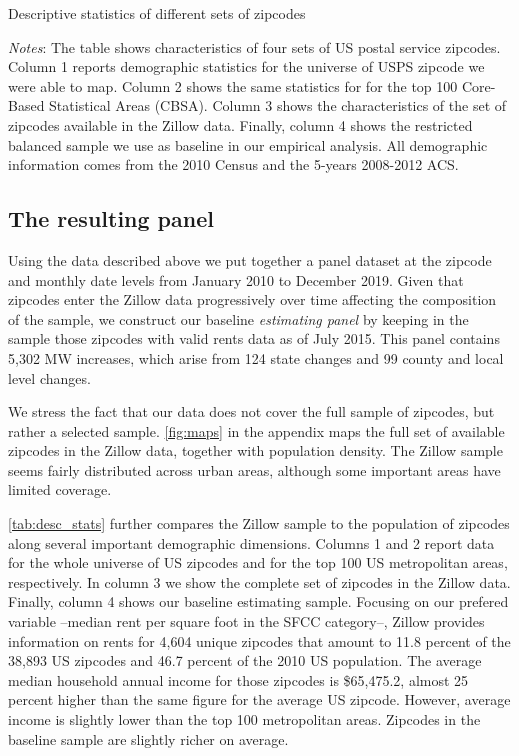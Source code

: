 \begin{table}[h!]
	\caption{Descriptive statistics of different sets of zipcodes}
	\centering
	\label{tab:desc_stats}    
	
	\begin{minipage}{0.95\textwidth} \footnotesize
		\vspace{3mm} 
		\textit{Notes}: The table shows characteristics of four sets of US postal service 
		zipcodes. Column 1 reports demographic statistics for the universe of USPS zipcode we 
		were able to map. Column 2 shows the same statistics for for the top 100 Core-Based 
		Statistical Areas (CBSA). Column 3 shows the characteristics of the set of zipcodes 
		available in the Zillow data. Finally, column 4 shows the restricted balanced sample 
		we use as baseline in our empirical analysis. All demographic information comes from 
		the 2010 Census and the 5-years 2008-2012 ACS.
	\end{minipage}
\end{table}


\subsection{The resulting panel}

Using the data described above we put together a panel dataset at the zipcode and monthly 
date levels from January 2010 to December 2019. Given that zipcodes enter the Zillow data 
progressively over time affecting the composition of the sample, we construct our baseline 
\textit{estimating panel} by keeping in the sample those zipcodes with valid rents data as 
of July 2015. This panel contains 5,302 MW increases, which arise from 124 state changes 
and 99 county and local level changes.

We stress the fact that our data does not cover the full sample of zipcodes, but rather a
selected sample. \autoref{fig:maps} in the appendix maps the full set of available zipcodes
in the Zillow data, together with population density. The Zillow sample seems fairly 
distributed across urban areas, although some important areas have limited coverage. 

\autoref{tab:desc_stats} further compares the Zillow sample to the population of zipcodes
along several important demographic dimensions. Columns 1 and 2 report data for the whole 
universe of US zipcodes and for the top 100 US metropolitan areas, respectively. In column 
3 we show the complete set of zipcodes in the Zillow data. Finally, column 4 shows our 
baseline estimating sample. Focusing on our prefered variable --median rent per square
foot in the SFCC category--, Zillow provides information on rents for 4,604 unique zipcodes 
that amount to 11.8 percent of the 38,893 US zipcodes and 46.7 percent of the 2010 US 
population. The average median household annual income for those zipcodes is \$65,475.2, 
almost 25 percent higher than the same figure for the average US zipcode. However, average 
income is slightly lower than the top 100 metropolitan areas. Zipcodes in the baseline 
sample are slightly richer on average. 

